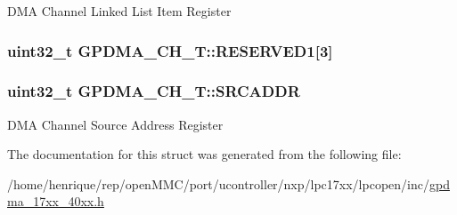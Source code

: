 D\-M\-A Channel Linked List Item Register \hypertarget{structGPDMA__CH__T_ae6a0ee831032674d792f9da150e3025e}{
\subsubsection[{R\-E\-S\-E\-R\-V\-E\-D1}]{ uint32\-\_\-t G\-P\-D\-M\-A\-\_\-\-C\-H\-\_\-\-T\-::\-R\-E\-S\-E\-R\-V\-E\-D1\mbox{[}3\mbox{]}}}\label{structGPDMA__CH__T_ae6a0ee831032674d792f9da150e3025e}
\hypertarget{structGPDMA__CH__T_a734e1803144cdaa3cfab1507fa4f05d9}{
\subsubsection[{S\-R\-C\-A\-D\-D\-R}]{ uint32\-\_\-t G\-P\-D\-M\-A\-\_\-\-C\-H\-\_\-\-T\-::\-S\-R\-C\-A\-D\-D\-R}}\label{structGPDMA__CH__T_a734e1803144cdaa3cfab1507fa4f05d9}
D\-M\-A Channel Source Address Register 

The documentation for this struct was generated from the following file\-:\begin{DoxyCompactItemize}
\item 
/home/henrique/rep/open\-M\-M\-C/port/ucontroller/nxp/lpc17xx/lpcopen/inc/\hyperlink{gpdma__17xx__40xx_8h}{gpdma\-\_\-17xx\-\_\-40xx.\-h}\end{DoxyCompactItemize}
